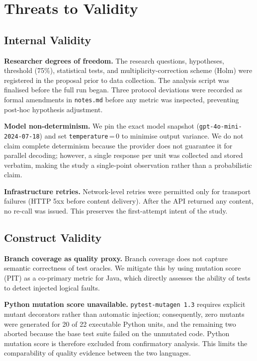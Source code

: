 \section{Threats to Validity}
\label{sec:threats}

\subsection{Internal Validity}

\textbf{Researcher degrees of freedom.}
The research questions, hypotheses, threshold (75\%), statistical tests, and
multiplicity-correction scheme (Holm) were registered in the proposal prior to
data collection.
The analysis script was finalised before the full run began.
Three protocol deviations were recorded as formal amendments in \texttt{notes.md}
before any metric was inspected, preventing post-hoc hypothesis adjustment.

\textbf{Model non-determinism.}
We pin the exact model snapshot (\texttt{gpt-4o-mini-2024-07-18}) and set
\texttt{temperature}\,=\,0 to minimise output variance.
We do not claim complete determinism because the provider does not guarantee it
for parallel decoding; however, a single response per unit was collected and
stored verbatim, making the study a single-point observation rather than a
probabilistic claim.

\textbf{Infrastructure retries.}
Network-level retries were permitted only for transport failures (HTTP 5xx before
content delivery).
After the API returned any content, no re-call was issued.
This preserves the first-attempt intent of the study.

\subsection{Construct Validity}

\textbf{Branch coverage as quality proxy.}
Branch coverage does not capture semantic correctness of test oracles.
We mitigate this by using mutation score (PIT) as a co-primary metric for Java,
which directly assesses the ability of tests to detect injected logical faults.

\textbf{Python mutation score unavailable.}
\texttt{pytest-mutagen 1.3} requires explicit mutant decorators rather than
automatic injection; consequently, zero mutants were generated for 20 of 22
executable Python units, and the remaining two aborted because the base test suite
failed on the unmutated code.
Python mutation score is therefore excluded from confirmatory analysis.
This limits the comparability of quality evidence between the two languages.

